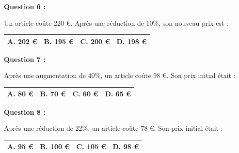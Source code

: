 \documentclass[12pt,a4paper]{article}
\begin{document}
\textbf{Question 6 :}
\vspace{5pt}

Un article coûte 220 €. Après une réduction de 10\%, son nouveau prix est :
\vspace{0.3cm}

\renewcommand{\arraystretch}{3}
\begin{tabular}{|m{3.4cm}|m{3.4cm}|m{3.4cm}|m{3.4cm}|}
\hline
\centering \vspace{-0.3cm} \textbf{A.} 202 € & 
\centering \vspace{-0.3cm} \textbf{B.} 195 € & 
\centering \vspace{-0.3cm} \textbf{C.} 200 € & 
\centering \vspace{-0.3cm} \textbf{D.} 198 € \tabularnewline
\hline
\end{tabular}

\vspace{0.7cm}

\textbf{Question 7 :}
\vspace{5pt}

Après une augmentation de 40\%, un article coûte 98 €. Son prix initial était :
\vspace{0.3cm}

\renewcommand{\arraystretch}{3}
\begin{tabular}{|m{3.4cm}|m{3.4cm}|m{3.4cm}|m{3.4cm}|}
\hline
\centering \vspace{-0.3cm} \textbf{A.} 80 € & 
\centering \vspace{-0.3cm} \textbf{B.} 70 € & 
\centering \vspace{-0.3cm} \textbf{C.} 60 € & 
\centering \vspace{-0.3cm} \textbf{D.} 65 € \tabularnewline
\hline
\end{tabular}

\vspace{0.7cm}

\textbf{Question 8 :}
\vspace{5pt}

Après une réduction de 22\%, un article coûte 78 €. Son prix initial était :
\vspace{0.3cm}

\renewcommand{\arraystretch}{3}
\begin{tabular}{|m{3.4cm}|m{3.4cm}|m{3.4cm}|m{3.4cm}|}
\hline
\centering \vspace{-0.3cm} \textbf{A.} 95 € & 
\centering \vspace{-0.3cm} \textbf{B.} 100 € & 
\centering \vspace{-0.3cm} \textbf{C.} 105 € & 
\centering \vspace{-0.3cm} \textbf{D.} 98 € \tabularnewline
\hline
\end{tabular}
\end{document}
